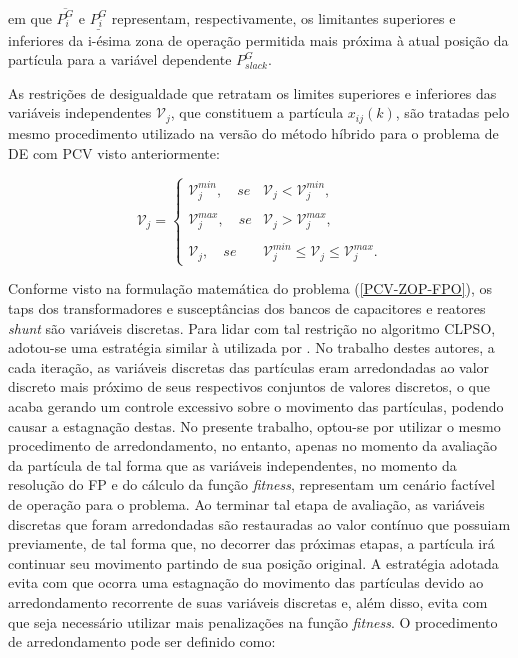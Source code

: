 \documentclass[
	12pt,				%
	openany,			%
	twoside,			%
	a4paper,			%
	chapter=TITLE,		%
	section=Title,		%
	subsection=Title,	%
	subsubsection=Title,%
	english,			%
	french,				%
	spanish,			%
	brazil			%
	]{abntex2}
\begin{document}
\begin{ERRATA}
\pagebreak

\noindent em que $\overline{P^G_{i}}$ e $\underline{P^G_{i}}$ representam, respectivamente, os limitantes superiores e inferiores
da i-ésima zona de operação permitida mais próxima à atual posição da partícula para a variável dependente $P^G_{slack}$.

As restrições de desigualdade que retratam os limites superiores e inferiores das variáveis independentes $\mathcal{V}_j$, que constituem a partícula $x_{ij}(k)$, são tratadas pelo mesmo procedimento utilizado na versão do método híbrido para o problema de DE com PCV visto anteriormente:


\begin{equation}\label{proc10}
\mathcal{V}_j = \begin{cases}
\mathcal{V}_j^{min}, \quad se & \mathcal{V}_j < \mathcal{V}_j^{min},\\\\
\mathcal{V}_j^{max}, \quad se & \mathcal{V}_j > \mathcal{V}_j^{max},\\\\
\mathcal{V}_j, \quad se & \mathcal{V}_j^{min} \leq \mathcal{V}_j \leq \mathcal{V}_j^{max}.
\end{cases}
\end{equation}

Conforme visto na formulação matemática do problema (\ref{PCV-ZOP-FPO}), os taps dos transformadores e susceptâncias dos bancos de capacitores e reatores \emph{shunt} são variáveis discretas. Para lidar com tal restrição no algoritmo CLPSO, adotou-se uma estratégia similar à utilizada por . No trabalho destes autores, a cada iteração, as variáveis discretas das partículas eram arredondadas ao valor discreto mais próximo de seus respectivos conjuntos de valores discretos, o que acaba gerando um controle excessivo sobre o movimento das partículas, podendo causar a estagnação destas. No presente trabalho, optou-se por utilizar o mesmo procedimento de arredondamento, no entanto, apenas no momento da avaliação da partícula de tal forma que as variáveis independentes, no momento da resolução do FP e do cálculo da função \emph{fitness}, representam um cenário factível de operação para o problema. Ao terminar tal etapa de avaliação, as variáveis discretas que foram arredondadas são restauradas ao valor contínuo que possuiam previamente, de tal forma que, no decorrer das próximas etapas, a partícula irá continuar seu movimento partindo de sua posição original. A estratégia adotada evita com que ocorra uma estagnação do movimento das partículas devido ao arredondamento recorrente de suas variáveis discretas e, além disso, evita com que seja necessário utilizar mais penalizações na função \emph{fitness}. O procedimento de arredondamento pode ser definido como:


\end{ERRATA}
\end{document}
